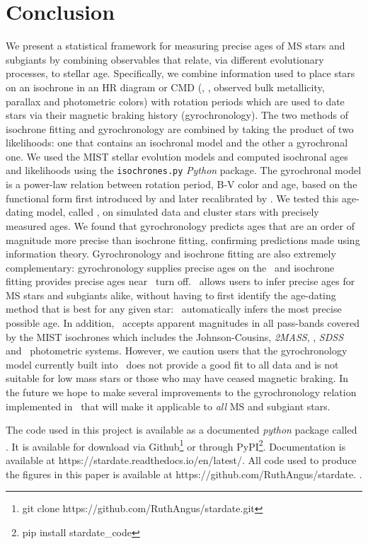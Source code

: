 \section{Conclusion}
\label{section:conclusion}

We present a statistical framework for measuring precise ages of MS stars and
subgiants by combining observables that relate, via different evolutionary
processes, to stellar age.
Specifically, we combine information used to place stars on an isochrone in an
HR diagram or CMD (\teff, \logg, observed bulk metallicity, parallax and
photometric colors) with rotation periods which are used to date stars via
their magnetic braking history (gyrochronology).
The two methods of isochrone fitting and gyrochronology are combined by taking
the product of two likelihoods: one that contains an isochronal model and the
other a gyrochronal one.
We used the MIST stellar evolution models and computed isochronal ages and
likelihoods using the {\tt isochrones.py} {\it Python} package.
The gyrochronal model is a power-law relation between rotation period, B-V
color and age, based on the functional form first introduced by
\citet{barnes2003} and later recalibrated by \citet{angus2015}.
We tested this age-dating model, called \sd, on simulated data and cluster
stars with precisely measured ages.
We found that gyrochronology predicts ages that are an order of magnitude more
precise than isochrone fitting, confirming predictions made using information
theory.
Gyrochronology and isochrone fitting are also extremely complementary:
gyrochronology supplies precise ages on the \MS\ and isochrone fitting
provides precise ages near \MS\ turn off.
\sd\ allows users to infer precise ages for MS stars and subgiants alike,
without having to first identify the age-dating method that is best for any
given star: \sd\ automatically infers the most precise possible age.
In addition, \sd\ accepts apparent magnitudes in all pass-bands covered by the
MIST isochrones which includes the Johnson-Cousins, {\it 2MASS}, \Kepler, {\it
SDSS} and \Gaia\ photometric systems.
However, we caution users that the gyrochronology model currently built into
\sd\ does not provide a good fit to all data and is not suitable for low mass
stars or those who may have ceased magnetic braking.
In the future we hope to make several improvements to the gyrochronology
relation implemented in \sd\ that will make it applicable to {\it all} MS and
subgiant stars.

The code used in this project is available as a documented {\it python}
package called \sd.
It is available for download via Github\footnote{git clone
https://github.com/RuthAngus/stardate.git} or through
PyPI\footnote{pip install stardate\_code}.
Documentation is available at https://stardate.readthedocs.io/en/latest/.
All code used to produce the figures in this paper is available at
https://github.com/RuthAngus/stardate.
.
